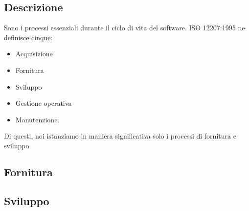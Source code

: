 \documentclass[../norme-di-progetto.tex]{subfiles}
\begin{document}
\subsection{Descrizione}%
\label{sub:processi_primari/descrizione}
Sono i processi essenziali durante il ciclo di vita del software. ISO 12207:1995 ne definisce cinque:

\begin{itemize}
  \item Acquisizione
  \item Fornitura
  \item Sviluppo
  \item Gestione operativa
  \item Manutenzione.
\end{itemize}

Di questi, noi istanziamo in maniera significativa solo i processi di fornitura e sviluppo.

\subsection{Fornitura}%
\label{sub:fornitura}



\subsection{Sviluppo}%
\label{sub:sviluppo}


\end{document}

